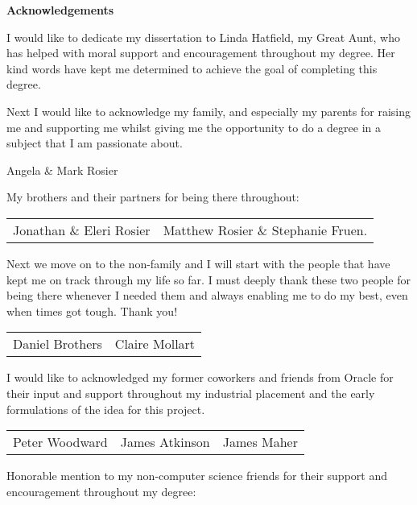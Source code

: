 \thispagestyle{empty}

\begin{center}
{\LARGE\bf Acknowledgements}

I would like to dedicate my dissertation to Linda Hatfield, my Great Aunt, who has helped with moral support and encouragement throughout my degree. Her kind words have kept me determined to achieve the goal of completing this degree.

Next I would like to acknowledge my family, and especially my parents for raising me and supporting me whilst giving me the opportunity to do a degree in a subject that I am passionate about.

Angela \& Mark Rosier

My brothers and their partners for being there throughout:

\begin{tabular}{ l r }
Jonathan \& Eleri Rosier & Matthew Rosier \& Stephanie Fruen.\\
\end{tabular}

\vspace{3mm}

Next we move on to the non-family and I will start with the people that have kept me on track through my life so far. I must deeply thank these two people for being there whenever I needed them and always enabling me to do my best, even when times got tough. Thank you!

\begin{tabular}{ l r }
Daniel Brothers & Claire Mollart\\
\end{tabular}

\vspace{3mm}

I would like to acknowledged my former coworkers and friends from Oracle for their input and support throughout my industrial placement and the early formulations of the idea for this project.

\begin{tabular}{ l c r }
Peter Woodward & James Atkinson & James Maher\\
\end{tabular}

\vspace{3mm}

Honorable mention to my non-computer science friends for their support and encouragement throughout my degree:


\end{center}

